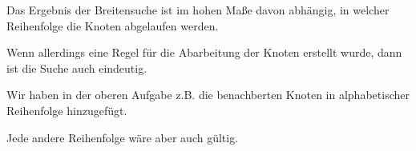 Das Ergebnis der Breitensuche ist im hohen Maße davon abhängig, in welcher Reihenfolge die Knoten abgelaufen werden.

Wenn allerdings eine Regel für die Abarbeitung der Knoten erstellt wurde, dann ist die Suche auch eindeutig.

Wir haben in der oberen Aufgabe z.B. die benachberten Knoten in alphabetischer Reihenfolge hinzugefügt.

Jede andere Reihenfolge wäre aber auch gültig.


